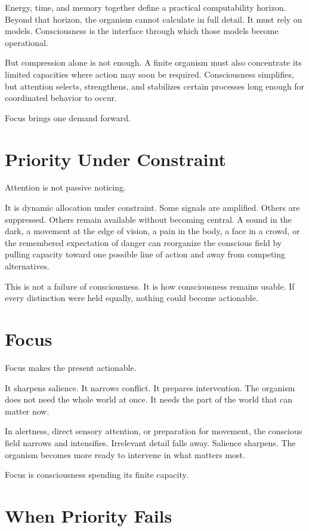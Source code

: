 \documentclass[11pt,twoside,openright]{book}
\begin{document}
Energy, time, and memory together define a practical computability horizon. Beyond that horizon, the organism cannot calculate in full detail. It must rely on models. Consciousness is the interface through which those models become operational.

But compression alone is not enough. A finite organism must also concentrate its limited capacities where action may soon be required. Consciousness simplifies, but attention selects, strengthens, and stabilizes certain processes long enough for coordinated behavior to occur.

Focus brings one demand forward.

\section*{Priority Under Constraint}

Attention is not passive noticing.

It is dynamic allocation under constraint. Some signals are amplified. Others are suppressed. Others remain available without becoming central. A sound in the dark, a movement at the edge of vision, a pain in the body, a face in a crowd, or the remembered expectation of danger can reorganize the conscious field by pulling capacity toward one possible line of action and away from competing alternatives.

This is not a failure of consciousness. It is how consciousness remains usable. If every distinction were held equally, nothing could become actionable.

\section*{Focus}

Focus makes the present actionable.

It sharpens salience. It narrows conflict. It prepares intervention. The organism does not need the whole world at once. It needs the part of the world that can matter now.

In alertness, direct sensory attention, or preparation for movement, the conscious field narrows and intensifies. Irrelevant detail falls away. Salience sharpens. The organism becomes more ready to intervene in what matters most.

Focus is consciousness spending its finite capacity.

\section*{When Priority Fails}
\end{document}
